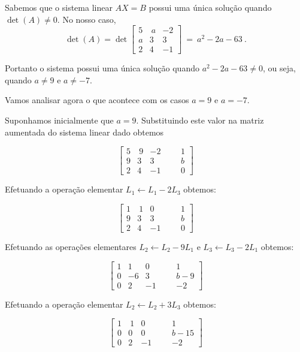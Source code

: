 \begin{solution}
Sabemos que o sistema linear $AX=B$ possui uma única solução quando $\det(A) \neq 0$. No nosso caso,
$$ \det(A) = \det\left[\begin{array}{rrr}
  5 & \ a &   -2  \\
  a &   3 &    3  \\ 
  2 &   4 &   -1  \end{array}\right]\ =\ a^2-2a-63\ . $$

Portanto o sistema possui uma única solução quando $a^2-2a-63 \neq 0$, ou seja, quando $a\neq 9$ e $a\neq -7$.

\bigskip
Vamos analisar agora o que acontece com os casos $a=9$ e $a=-7$.

\bigskip
Suponhamos inicialmente que $a=9$. Substituindo este valor na matriz aumentada do sistema linear dado obtemos

$$ \left[\begin{array}{rrrr|rr}
  5 & \ 9 &   -2 & & &   1  \\
  9 &   3 &    3 & & &   b  \\ 
  2 &   4 &   -1 & & &   0  \end{array}\right] $$

Efetuando a operação elementar $L_1 \leftarrow L_1 - 2L_3$ obtemos:

$$ \left[\begin{array}{rrrr|rr}
  1  & \ 1  &   0   & & &   1  \\
  9  &   3  &   3   & & &   b  \\ 
  2  &   4  &  -1   & & &   0  \end{array}\right] $$

Efetuando as operações elementares $L_2 \leftarrow L_2 - 9L_1$  e  $L_3 \leftarrow L_3 - 2L_1$ obtemos:

$$ \left[\begin{array}{rrrr|rc}
  1  &   1  &   0   & & &   1    \\
  0  &  -6  &   3   & & &   b-9  \\ 
  0  &   2  &  -1   & & &   -2     \end{array}\right] $$

Efetuando a operação elementar $L_2 \leftarrow L_2 + 3L_3$ obtemos:

$$ \left[\begin{array}{rrrr|rc}
  1  & \ 1  &   0   & & &   1    \\
  0  &   0  &   0   & & &   b-15  \\ 
  0  &   2  &  -1   & & &   -2     \end{array}\right] $$


\end{solution}
